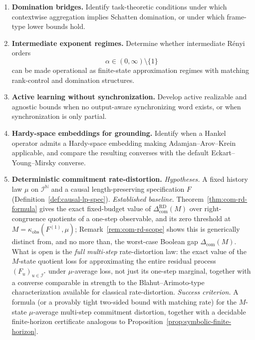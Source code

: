 \documentclass[12pt]{article}
\theoremstyle{definition}
\newcommand{\Com}{\Delta_{\mathrm{com}}}
\newcommand{\Comex}{\Com}
\newcommand{\ComRD}{\Delta_{\mathrm{com}}^{\mathrm{RD}}}
\begin{document}
\begin{enumerate}[leftmargin=2.0em]
\item \textbf{Domination bridges.}
Identify task-theoretic conditions under which contextwise aggregation
implies Schatten domination, or under which frame-type lower bounds hold.

\item \textbf{Intermediate exponent regimes.}
Determine whether intermediate R\'enyi orders
\[
\alpha\in(0,\infty)\setminus\{1\}
\]
can be made operational as finite-state approximation regimes with matching
rank-control and domination structures.

\item \textbf{Active learning without synchronization.}
Develop active realizable and agnostic bounds when no output-aware
synchronizing word exists, or when synchronization is only partial.

\item \textbf{Hardy-space embeddings for grounding.}
Identify when a Hankel operator admits a Hardy-space embedding making
Adamjan--Arov--Krein applicable, and compare the resulting converses with
the default Eckart--Young--Mirsky converse.

\item \textbf{Deterministic commitment rate-distortion.}
\emph{Hypotheses.} A fixed history law $\mu$ on $\mathcal I^{\mathbb N}$ and a
causal length-preserving specification $F$ (Definition~\ref{def:causal-lp-spec}).
\emph{Established baseline.} Theorem~\ref{thm:com-rd-formula} gives the exact
fixed-budget value of $\ComRD(M)$ over right-congruence quotients of a
one-step observable, and its zero threshold at
$M=\kappa_{\mathrm{obs}}(F^{(1)},\mu)$; Remark~\ref{rem:com-rd-scope} shows
this is generically distinct from, and no more than, the worst-case Boolean
gap $\Comex(M)$.  What is open is the \emph{full multi-step} rate-distortion
law: the exact value of the $M$-state quotient loss for approximating the
entire residual process $(F_u)_{u\in\mathcal I^*}$ under $\mu$-average loss,
not just its one-step marginal, together with a converse comparable in
strength to the Blahut--Arimoto-type characterization available for classical
rate-distortion.
\emph{Success criterion.} A formula (or a provably tight two-sided bound with
matching rate) for the $M$-state $\mu$-average multi-step commitment
distortion, together with a decidable finite-horizon certificate analogous to
Proposition~\ref{prop:symbolic-finite-horizon}.


\end{enumerate}
\end{document}
